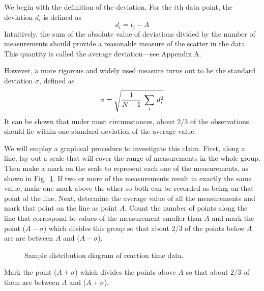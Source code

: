      We begin with the definition of the deviation.  For the $i$th
data point, the deviation $d_{i}$ is defined as
\begin{equation}
d_{i} = t_{i} - A  \label{eq:react3}
\end{equation}
Intuitively, the sum of the absolute value of deviations divided by the number of
measurements  should provide a reasonable
measure of the scatter in the data.  This quantity is called the
average deviation---see Appendix A.

However,
a more rigorous and widely used measure
turns out to be the standard deviation $\sigma$, defined as
\begin{equation}
\sigma = \sqrt { {{1} \over {N - 1}} \: \sum_{i} \, d_{i}^{2} }
  \label{eq:react4}
\end{equation}
It can be shown that under most circumstances, about 2/3 of the
observations should lie within one standard deviation of the
average value.

     We will employ a graphical procedure to investigate this
claim.  First, along a line, lay out a scale that will cover the
range of measurements in the whole group.  Then make a mark on
the scale to represent each one of the measurements, as shown in
Fig.~\ref{fig:react1}.  If two or more of the measurements result in exactly
the same value, make one mark above the other so both can be recorded
as being on that point of the line.  Next, determine the average
value of all the measurements and mark that point on the line as
point $A$.  Count the number of points along the line that
correspond to values of the measurement smaller than $A$ and mark
the point ($A - \sigma$) which divides this group so that about 2/3 of the
points below $A$ are are between $A$ and ($A - \sigma$).
\begin{figure}
\begin{center}
{}
\end{center}
 \caption{Sample distribution diagram of reaction time data.   \label{fig:react1}}
\end{figure}
Mark the point ($A + \sigma$) which divides the points above $A$ so that
about 2/3 of them are between $A$ and ($A + \sigma$).

